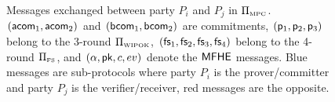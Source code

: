 
\begin{figure}
\vspace{-1ex}
\centerline{}
\caption{Messages exchanged between party $P_i$ and $P_j$ in $\Pi_{\scriptscriptstyle\mathrm{MPC}}$.
  $(\mathsf{acom}_1,\mathsf{acom}_2)$ and $({\mathsf{bcom}}_1,{\mathsf{bcom}}_2)$ are commitments, $(\mathsf{p}_1, \mathsf{p}_2, \mathsf{p}_3)$ belong to the 3-round $\Pi_{\scriptscriptstyle\mathrm{WIPOK}}$, $(\mathsf{fs}_1, \mathsf{fs}_2, \mathsf{fs}_3,\mathsf{fs}_4)$ belong to the 4-round $\Pi_{\scriptscriptstyle\mathrm{FS}}$, and $(\alpha,{\mathsf{pk}},c,ev)$ denote the ${\mathsf{MFHE}}$ messages. Blue messages are sub-protocols where party $P_i$ is the prover/committer and party $P_j$ is the verifier/receiver, red messages are the opposite.}
\label{messages}
\vspace{-3ex}
\end{figure}
%














